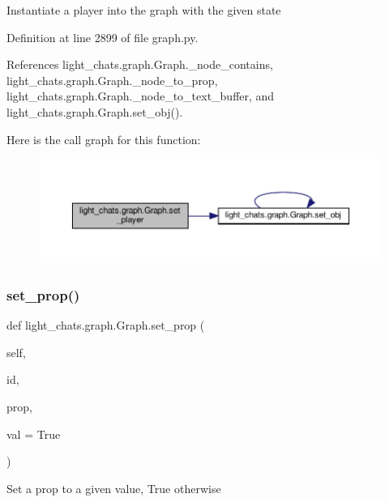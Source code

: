 \begin{DoxyVerb}Instantiate a player into the graph with the given state\end{DoxyVerb}
 

Definition at line 2899 of file graph.\+py.



References light\+\_\+chats.\+graph.\+Graph.\+\_\+node\+\_\+contains, light\+\_\+chats.\+graph.\+Graph.\+\_\+node\+\_\+to\+\_\+prop, light\+\_\+chats.\+graph.\+Graph.\+\_\+node\+\_\+to\+\_\+text\+\_\+buffer, and light\+\_\+chats.\+graph.\+Graph.\+set\+\_\+obj().

Here is the call graph for this function\+:
\nopagebreak
\begin{figure}[H]
\begin{center}
\leavevmode
\includegraphics[width=350pt]{classlight__chats_1_1graph_1_1Graph_a4130e8f504f9a6eeafbc83a8a38a6efb_cgraph}
\end{center}
\end{figure}
\mbox{\label{classlight__chats_1_1graph_1_1Graph_ae2c69adb1ea1477aaa6d9af693b30fa1}} 
\subsubsection{\texorpdfstring{set\+\_\+prop()}{set\_prop()}}
{\footnotesize\ttfamily def light\+\_\+chats.\+graph.\+Graph.\+set\+\_\+prop (\begin{DoxyParamCaption}\item[{}]{self,  }\item[{}]{id,  }\item[{}]{prop,  }\item[{}]{val = {\ttfamily True} }\end{DoxyParamCaption})}

\begin{DoxyVerb}Set a prop to a given value, True otherwise\end{DoxyVerb}
 


